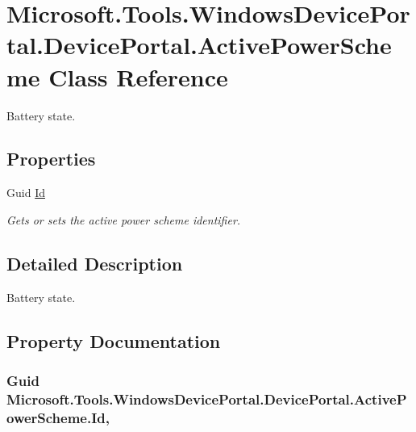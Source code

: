 \hypertarget{class_microsoft_1_1_tools_1_1_windows_device_portal_1_1_device_portal_1_1_active_power_scheme}{}\section{Microsoft.\+Tools.\+Windows\+Device\+Portal.\+Device\+Portal.\+Active\+Power\+Scheme Class Reference}
\label{class_microsoft_1_1_tools_1_1_windows_device_portal_1_1_device_portal_1_1_active_power_scheme}


Battery state.  


\subsection*{Properties}
\begin{DoxyCompactItemize}
\item 
Guid \hyperlink{class_microsoft_1_1_tools_1_1_windows_device_portal_1_1_device_portal_1_1_active_power_scheme_a26f4635b7e8a727801c3de150b4c5eaf}{Id}
\begin{DoxyCompactList}\small\item\em Gets or sets the active power scheme identifier. \end{DoxyCompactList}\end{DoxyCompactItemize}


\subsection{Detailed Description}
Battery state. 



\subsection{Property Documentation}
\subsubsection[{\texorpdfstring{Id}{Id}}]{\setlength{\rightskip}{0pt plus 5cm}Guid Microsoft.\+Tools.\+Windows\+Device\+Portal.\+Device\+Portal.\+Active\+Power\+Scheme.\+Id\hspace{0.3cm}{\ttfamily [get]}, {\ttfamily [set]}}\hypertarget{class_microsoft_1_1_tools_1_1_windows_device_portal_1_1_device_portal_1_1_active_power_scheme_a26f4635b7e8a727801c3de150b4c5eaf}{}\label{class_microsoft_1_1_tools_1_1_windows_device_portal_1_1_device_portal_1_1_active_power_scheme_a26f4635b7e8a727801c3de150b4c5eaf}



